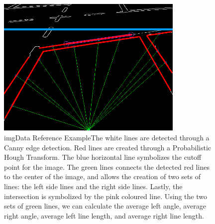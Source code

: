 \documentclass [10pt]{article}
\begin{document}
    \begin{figure}[h]
    \caption{imgData Reference Example\newline The white lines are detected through a Canny edge detection.\newline
            Red lines are created through a Probabilistic Hough Transform. \newline
            The blue horizontal line symbolizes the cutoff point for the image. \newline
            The green lines connects the detected red lines to the center of the image, and allows the creation of two sets of lines: the left side lines and the right side lines. \newline
            Lastly, the intersection is symbolized by the pink coloured line.\newline
            Using the two sets of green lines, we can calculate the average left angle, average right angle, average left line length, and average right line length.}
    \includegraphics[width=0.8\textwidth]{figures/houghref.png}
    \end{figure}
        
    \vspace{0.5cm}
    
    \newpage
    
\end{document}

